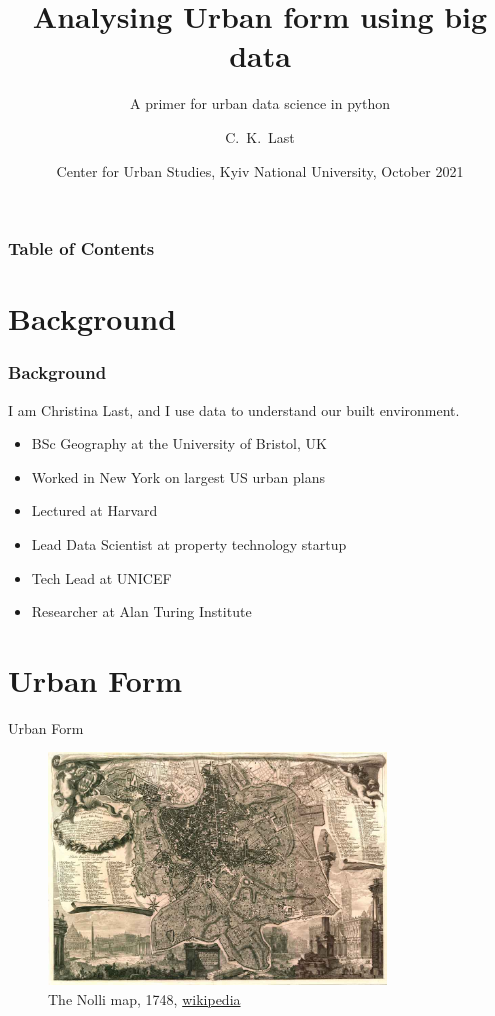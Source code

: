 \documentclass{beamer}
\title[Analysing Urban form using big data] %
{Analysing Urban form using big data}
\subtitle{A primer for urban data science in python}
\author[Christina, Last] %
{C.~K.~Last}
\institute[ATI] %
{
  The Alan Turing Institute\\
  The UK's Institute for Artificial Intelligence and Data Science
}
\date[CUS 2021] %
{Center for Urban Studies, Kyiv National University, October 2021}
\begin{document}
\frame{\titlepage}


\begin{frame}
\frametitle{Table of Contents}
\tableofcontents
\end{frame}


\section{Background}

\begin{frame}
\frametitle{Background}
I am Christina Last, and I use data to understand our built environment.
\begin{itemize}
    \item<1-> BSc Geography at the University of Bristol, UK
    \item<2-> Worked in New York on largest US urban plans
    \item<3-> Lectured at Harvard
    \item<4-> Lead Data Scientist at property technology startup
    \item<5-> Tech Lead at UNICEF
    \item<6-> Researcher at Alan Turing Institute
\end{itemize}
\end{frame}


\section{Urban Form}

\begin{frame}{Urban Form}
\begin{figure}
\includegraphics[width=0.8\textwidth]{images/nolli_map_rome.jpg}
\caption{The Nolli map, 1748,  \href{https://commons.wikimedia.org/wiki/File:Nolli_map1.jpg}{wikipedia}}
\end{figure}
\end{frame}
\end{document}
